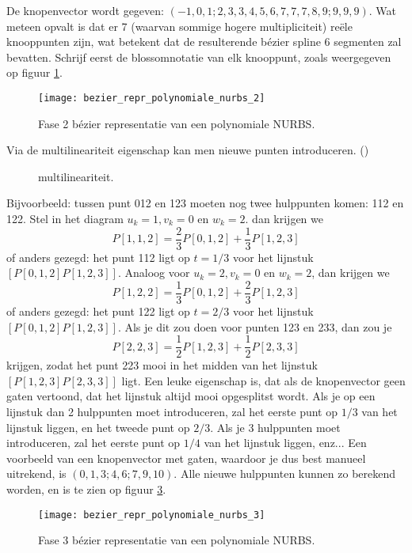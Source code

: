 \documentclass{report}
\begin{document}
\begin{itemize}
{\begin{itemize}
			De knopenvector wordt gegeven: $(-1, 0, 1 ; 2, 3, 3, 4, 5, 6, 7, 7, 7, 8, 9 ; 9, 9, 9)$. Wat meteen opvalt is dat er 7 (waarvan sommige hogere multipliciteit) reële knooppunten zijn, wat betekent dat de resulterende bézier spline 6 segmenten zal bevatten. Schrijf eerst de blossomnotatie van elk knooppunt, zoals weergegeven op figuur \ref {fig:bezier_repr_polynomiale_nurbs_2}.
			\begin{figure}[ht]
				\centering
				\texttt{[image: bezier\_repr\_polynomiale\_nurbs\_2]}	
				\caption{Fase 2 bézier representatie van een polynomiale NURBS.}
				\label{fig:bezier_repr_polynomiale_nurbs_2}
			\end{figure}

			Via de multilineariteit eigenschap kan men nieuwe punten introduceren. ()
			\begin{figure}[ht]
				\centering
				\caption{multilineariteit.}
				\label{fig:multilineariteit}
			\end{figure}	

			Bijvoorbeeld: tussen punt 012 en 123 moeten nog twee hulppunten komen: 112 en 122. Stel in het diagram $u_k = 1, v_k = 0$ en $w_k = 2$. dan krijgen we
			$$P[1,1,2] = \frac{2}{3}P[0,1,2] + \frac{1}{3}P[1,2,3]$$
			of anders gezegd: het punt 112 ligt op $t = 1/3$ voor het lijnstuk $[P[0,1,2]P[1,2,3]]$.
			Analoog voor $u_k = 2, v_k = 0$ en $w_k = 2$, dan krijgen we
			$$P[1,2,2] = \frac{1}{3}P[0,1,2] + \frac{2}{3}P[1,2,3]$$
			of anders gezegd: het punt 122 ligt op $t = 2/3$ voor het lijnstuk  $[P[0,1,2]P[1,2,3]]$.
			Als je dit zou doen voor punten 123 en 233, dan zou je 
			$$P[2, 2, 3] = \frac{1}{2}P[1,2,3] + \frac{1}{2}P[2,3,3]$$
			krijgen, zodat het punt 223 mooi in het midden van het lijnstuk $[P[1,2,3]P[2,3,3]]$ ligt. Een leuke eigenschap is, dat als de knopenvector geen gaten vertoond, dat het lijnstuk altijd mooi opgesplitst wordt. Als je op een lijnstuk dan 2 hulppunten moet introduceren, zal het eerste punt op $1/3$ van het lijnstuk liggen, en het tweede punt op $2/3$. Als je 3 hulppunten moet introduceren, zal het eerste punt op $1/4$ van het lijnstuk liggen, enz... Een voorbeeld van een knopenvector met gaten, waardoor je dus best manueel uitrekend, is $(0, 1, 3 ; 4, 6 ; 7, 9, 10)$. Alle nieuwe hulppunten kunnen zo berekend worden, en is te zien op figuur \ref{fig:bezier_repr_polynomiale_nurbs_3}.
			\begin{figure}[ht]
				\centering
				\texttt{[image: bezier\_repr\_polynomiale\_nurbs\_3]}	
				\caption{Fase 3 bézier representatie van een polynomiale NURBS.}
				\label{fig:bezier_repr_polynomiale_nurbs_3}
			\end{figure}


\end{itemize}}
\end{itemize}
\end{document}

